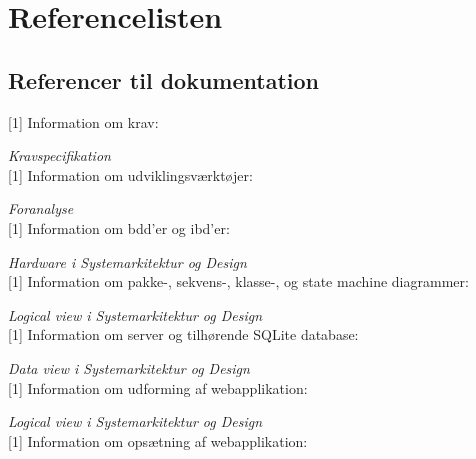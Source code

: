 \chapter{Referencelisten}


\section*{Referencer til dokumentation}

[1] Information om krav:
\vspace{-0.3cm}

\qquad \textit{Kravspecifikation} \\


[1] Information om udviklingsværktøjer:
\vspace{-0.3cm}

\qquad \textit{Foranalyse} \\


[1] Information om bdd'er og ibd'er:
\vspace{-0.3cm}

\qquad \textit{Hardware i Systemarkitektur og Design} \\


[1] Information om pakke-, sekvens-, klasse-, og state machine diagrammer:
\vspace{-0.3cm}

\qquad \textit{Logical view i Systemarkitektur og Design} \\


[1] Information om server og tilhørende SQLite database:
\vspace{-0.3cm}

\qquad \textit{Data view i Systemarkitektur og Design} \\


[1] Information om udforming af webapplikation:
\vspace{-0.3cm}

\qquad \textit{Logical view i Systemarkitektur og Design} \\


[1] Information om opsætning af webapplikation:
\vspace{-0.3cm}

